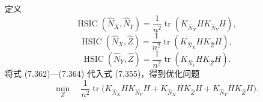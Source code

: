 定义
\begin{equation}
\operatorname{HSIC}(\widehat N_X,\widehat N_Y)
=\frac1{n^2}\operatorname{tr}(K_{\widehat N_X}HK_{\widehat N_Y}H),
\tag{7.362}
\end{equation}
\begin{equation}
\operatorname{HSIC}(\widehat N_X,\widehat Z)
=\frac1{n^2}\operatorname{tr}(K_{\widehat N_X}HK_{\widehat Z}H),
\tag{7.363}
\end{equation}
\begin{equation}
\operatorname{HSIC}(\widehat N_Y,\widehat Z)
=\frac1{n^2}\operatorname{tr}(K_{\widehat N_Y}HK_{\widehat Z}H).
\tag{7.364}
\end{equation}
将式 (7.362)—(7.364) 代入式 (7.355)，得到优化问题
\begin{equation}
\min_Z\quad \frac1{n^2}\operatorname{tr}\bigl(
K_{\widehat N_X}HK_{\widehat N_Y}H
+K_{\widehat N_X}HK_{\widehat Z}H
+K_{\widehat N_Y}HK_{\widehat Z}H\bigr).
\tag{7.365}
\end{equation}
